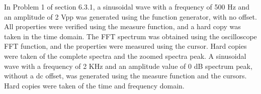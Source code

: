 In Problem 1 of section 6.3.1, a sinusoidal wave with a frequency of 500 Hz and an amplitude of 2 Vpp was generated using the function generator, with no offset. All properties were verified using the measure function, and a hard copy was taken in the time domain. The FFT spectrum was obtained using the oscilloscope FFT function, and the properties were measured using the cursor. Hard copies were taken of the complete spectra and the zoomed spectra peak. A sinusoidal wave with a frequency of 2 KHz and an amplitude value of 0 dB spectrum peak, without a dc offset, was generated using the measure function and the cursors. Hard copies were taken of the time and frequency domain.